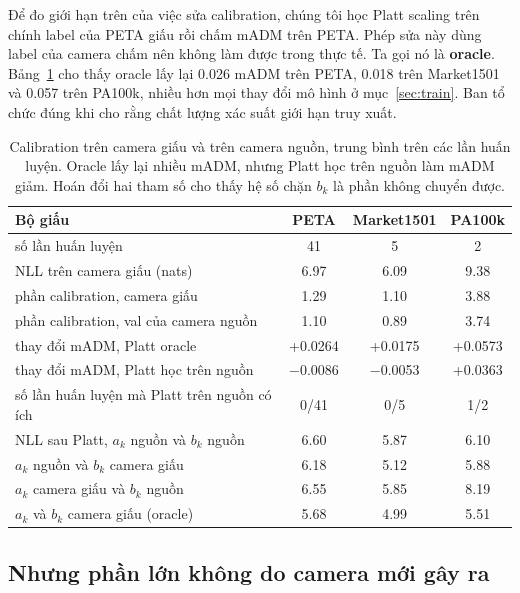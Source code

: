 \documentclass[11pt,a4paper]{article}
\begin{document}
Để đo giới hạn trên của việc sửa calibration, chúng tôi học Platt scaling trên chính label của PETA giấu rồi chấm mADM trên PETA. Phép sửa này dùng label của camera chấm nên không làm được trong thực tế. Ta gọi nó là \textbf{oracle}. Bảng~\ref{tab:calib} cho thấy oracle lấy lại 0.026 mADM trên PETA, 0.018 trên Market1501 và 0.057 trên PA100k, nhiều hơn mọi thay đổi mô hình ở mục~\ref{sec:train}. Ban tổ chức đúng khi cho rằng chất lượng xác suất giới hạn truy xuất.

\begin{table}[H]
\centering\small
\begin{tabular}{@{}lccc@{}}
\toprule
Bộ giấu & PETA & Market1501 & PA100k \\
\midrule
số lần huấn luyện & 41 & 5 & 2 \\
NLL trên camera giấu (nats) & 6.97 & 6.09 & 9.38 \\
phần calibration, camera giấu & 1.29 & 1.10 & 3.88 \\
phần calibration, val của camera nguồn & 1.10 & 0.89 & 3.74 \\
\midrule
thay đổi mADM, Platt oracle & +0.0264 & +0.0175 & +0.0573 \\
thay đổi mADM, Platt học trên nguồn & $-$0.0086 & $-$0.0053 & +0.0363 \\
số lần huấn luyện mà Platt trên nguồn có ích & 0/41 & 0/5 & 1/2 \\
\midrule
NLL sau Platt, $a_k$ nguồn và $b_k$ nguồn & 6.60 & 5.87 & 6.10 \\
\phantom{NLL sau Platt,} $a_k$ nguồn và $b_k$ camera giấu & 6.18 & 5.12 & 5.88 \\
\phantom{NLL sau Platt,} $a_k$ camera giấu và $b_k$ nguồn & 6.55 & 5.85 & 8.19 \\
\phantom{NLL sau Platt,} $a_k$ và $b_k$ camera giấu (oracle) & 5.68 & 4.99 & 5.51 \\
\bottomrule
\end{tabular}
\caption{Calibration trên camera giấu và trên camera nguồn, trung bình trên các lần huấn luyện. Oracle lấy lại nhiều mADM, nhưng Platt học trên nguồn làm mADM giảm. Hoán đổi hai tham số cho thấy hệ số chặn $b_k$ là phần không chuyển được.}
\label{tab:calib}
\end{table}

\subsection{Nhưng phần lớn không do camera mới gây ra}
\end{document}
